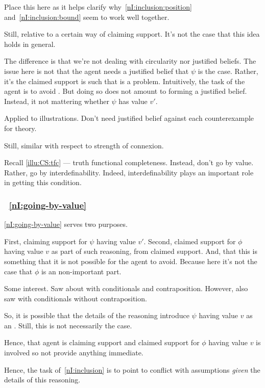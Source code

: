 \begin{note}[Literature]
  {
    \color{red}
    Place this here as it helps clarify why~\ref{nI:inclusion:position} and~\ref{nI:inclusion:bound} seem to work well together.
  }

  Still, relative to a certain way of claiming support.
  It's not the case that this idea holds in general.

  The difference is that we're not dealing with circularity nor justified beliefs.
  The issue here is not that the agent needs a justified belief that \(\psi\) is the case.
  Rather, it's the claimed support is such that \requ{} is a problem.
  Intuitively, the task of the agent is to avoid \requ{}.
  But doing so does not amount to forming a justified belief.
  Instead, it not mattering whether \(\psi\) has value \(v'\).

  Applied to illustrations.
  Don't need justified belief against each counterexample for theory.

  Still, similar with respect to strength of connexion.
\end{note}

\begin{note}
  \color{red}
  Recall \autoref{illu:CS:tfc} --- truth functional completeness.
  Instead, don't go by value.
  Rather, go by interdefinability.
  Indeed, interdefinability plays an important role in getting this condition.
\end{note}

\subsubsection{~\ref{nI:going-by-value}}

\begin{note}
  \ref{nI:going-by-value} serves two purposes.

  First, claiming support for \(\psi\) having value \(v'\).
  Second, claimed support for \(\phi\) having value \(v\) as part of such reasoning, from claimed support.
  And, that this is something that it is not possible for the agent to avoid.
  {
    \color{red} Because here it's not the case that \(\phi\) is an non-important part.
  }

  Some interest.
  Saw about with conditionals and contraposition.
  However, also saw with conditionals without contraposition.

  So, it is possible that the details of the reasoning introduce \(\psi\) having value \(v\) as an \requ{}.
  Still, this is not necessarily the case.

  Hence, that agent is claiming support and claimed support for \(\phi\) having value \(v\) is involved so not provide anything immediate.

  Hence, the task of~\ref{nI:inclusion} is to point to conflict with assumptions \emph{given} the details of this reasoning.
\end{note}

